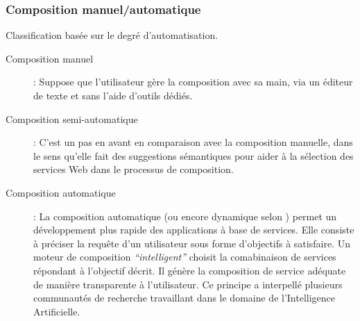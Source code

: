\begin{description}
      \end{description}            

      \subsubsection{Composition manuel/automatique}
      \label{sec:comp-manu}
      Classification basée sur le degré d'automatisation.

      \SpecialItem
      \begin{description}
      \item[Composition manuel]: Suppose que l'utilisateur gère la
        composition avec sa main, via un éditeur de texte et sans
        l'aide d'outils dédiés.

      \item[Composition semi-automatique]: C'est un pas en avant en
        comparaison avec la composition manuelle, dans le sens qu'elle
        fait des suggestions sémantiques pour aider à la sélection des
        services Web dans le processus de composition.

      \item[Composition automatique]: La composition automatique (ou
        encore dynamique selon \cite{fluegge2006challenges}) permet un
        développement plus rapide des applications à base de
        services. Elle consiste à préciser la requête d'un utilisateur
        sous forme d'objectifs à satisfaire. Un moteur de composition
        \textit{``intelligent''} choisit la comabinaison de services
        répondant à l'objectif décrit. Il génère la composition de
        service adéquate de manière transparente à l'utilisateur. Ce
        principe a interpellé plusieurs communautés de recherche
        travaillant dans le domaine de l'Intelligence Artificielle.
        \cite{elie2010}
      \end{description}

